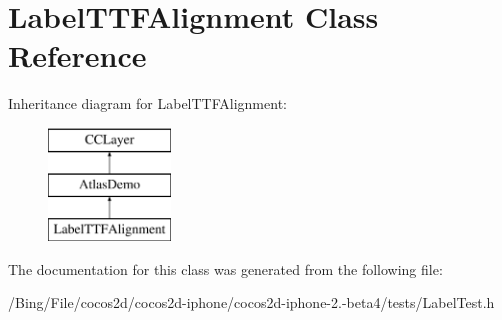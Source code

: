 \hypertarget{interface_label_t_t_f_alignment}{\section{Label\-T\-T\-F\-Alignment Class Reference}
\label{interface_label_t_t_f_alignment}
}
Inheritance diagram for Label\-T\-T\-F\-Alignment\-:\begin{figure}[H]
\begin{center}
\leavevmode
\includegraphics[height=3.000000cm]{interface_label_t_t_f_alignment}
\end{center}
\end{figure}


The documentation for this class was generated from the following file\-:\begin{DoxyCompactItemize}
\item 
/\-Bing/\-File/cocos2d/cocos2d-\/iphone/cocos2d-\/iphone-\/2.-\/beta4/tests/Label\-Test.\-h\end{DoxyCompactItemize}
